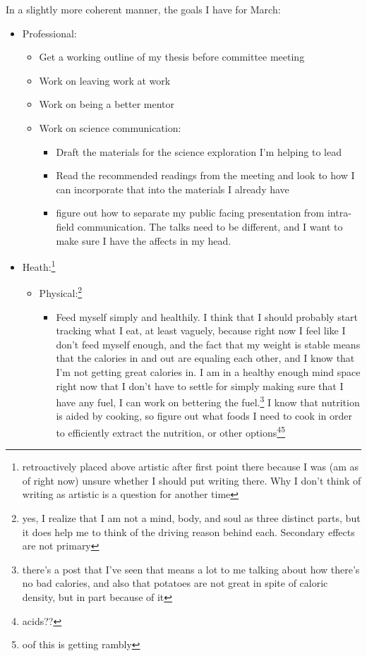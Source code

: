 \documentclass[12pt]{article}[titlepage]
\renewcommand{\,}{\textsuperscript{,}}
\begin{document}
In a slightly more coherent manner, the goals I have for March:  
\begin{itemize}  
\item Professional:  
\begin{itemize}  
\item Get a working outline of my thesis before committee meeting  
\item Work on leaving work at work  
\item Work on being a better mentor  
\item Work on science communication:  
\begin{itemize}  
\item Draft the materials for the science exploration I'm helping to lead  
\item Read the recommended readings from the meeting and look to how I can incorporate that into the materials I already have  
\item figure out how to separate my public facing presentation from intra-field communication. The talks need to be different, and I want to make sure I have the affects in my head.  
\end{itemize}  
\end{itemize}  
\item Heath:\footnote{retroactively placed above artistic after first point there because I was (am as of right now) unsure whether I should put writing there. Why I don't think of writing as artistic is a question for another time}  
\begin{itemize}  
\item Physical:\footnote{yes, I realize that I am not a mind, body, and soul as three distinct parts, but it does help me to think of the driving reason behind each. Secondary effects are not primary}  
\begin{itemize}  
\item Feed myself simply and healthily. I think that I should probably start tracking what I eat, at least vaguely, because right now I feel like I don't feed myself enough, and the fact that my weight is stable means that the calories in and out are equaling each other, and I know that I'm not getting great calories in. I am in a healthy enough mind space right now that I don't have to settle for simply making sure that I have any fuel, I can work on bettering the fuel.\footnote{there's a post that I've seen that means a lot to me talking about how there's no bad calories, and also that potatoes are not great in spite of caloric density, but in part because of it} I know that nutrition is aided by cooking, so figure out what foods I need to cook in order to efficiently extract the nutrition, or other options\footnote{acids??}\footnote{oof this is getting rambly}  

\end{itemize}
\end{itemize}
\end{itemize}
\end{document}
